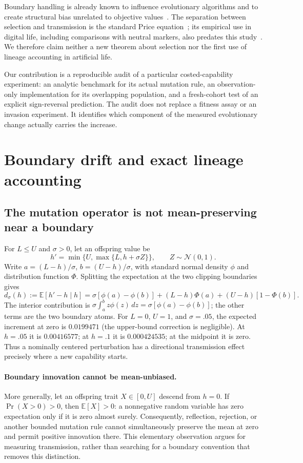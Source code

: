 \documentclass[10pt]{article}
\newcommand{\E}{\mathbb{E}}
\begin{document}
Boundary handling is already known to influence evolutionary algorithms and to create structural bias unrelated to objective values~\cite{caraffini,boks}. The separation between selection and transmission is the standard Price equation~\cite{price,frank}; its empirical use in digital life, including comparisons with neutral markers, also predates this study~\cite{mirmomeni}. We therefore claim neither a new theorem about selection nor the first use of lineage accounting in artificial life.

Our contribution is a reproducible audit of a particular costed-capability experiment: an analytic benchmark for its actual mutation rule, an observation-only implementation for its overlapping population, and a fresh-cohort test of an explicit sign-reversal prediction. The audit does not replace a fitness assay or an invasion experiment. It identifies which component of the measured evolutionary change actually carries the increase.

\newpage
\section{Boundary drift and exact lineage accounting}
\subsection{The mutation operator is not mean-preserving near a boundary}
For $L\le U$ and $\sigma>0$, let an offspring value be
\begin{equation}
 h'=\min\{U,\max\{L,h+\sigma Z\}\},\qquad Z\sim\mathcal N(0,1).
\end{equation}
Write $a=(L-h)/\sigma$, $b=(U-h)/\sigma$, with standard normal density $\phi$ and distribution function $\Phi$. Splitting the expectation at the two clipping boundaries gives
\begin{equation}\label{eq:drift}
 d_\sigma(h):=\E[h'-h\mid h]
 =\sigma[\phi(a)-\phi(b)]+(L-h)\Phi(a)+(U-h)[1-\Phi(b)].
\end{equation}
The interior contribution is $\sigma\int_a^b z\phi(z)\,dz=\sigma[\phi(a)-\phi(b)]$; the other terms are the two boundary atoms. For $L=0$, $U=1$, and $\sigma=.05$, the expected increment at zero is $0.0199471$ (the upper-bound correction is negligible). At $h=.05$ it is $0.00416577$; at $h=.1$ it is $0.000424535$; at the midpoint it is zero. Thus a nominally centered perturbation has a directional transmission effect precisely where a new capability starts.

\paragraph{Boundary innovation cannot be mean-unbiased.}
More generally, let an offspring trait $X\in[0,U]$ descend from $h=0$. If $\Pr(X>0)>0$, then $\E[X]>0$: a nonnegative random variable has zero expectation only if it is zero almost surely. Consequently, reflection, rejection, or another bounded mutation rule cannot simultaneously preserve the mean at zero and permit positive innovation there. This elementary observation argues for measuring transmission, rather than searching for a boundary convention that removes this distinction.
\end{document}
